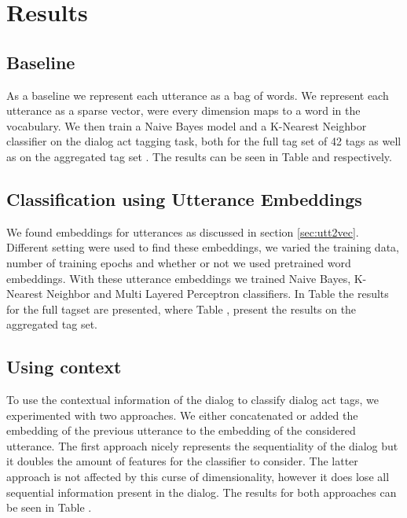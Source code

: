 \section{Results}\label{sec:results}
\subsection{Baseline}
As a baseline we represent each utterance as a bag of words. We represent each utterance as a sparse vector, were every dimension maps to a word in the vocabulary. We then train a Naive Bayes model and a K-Nearest Neighbor classifier on the dialog act tagging task, both for the full tag set of 42 tags as well as on the aggregated tag set . The results can be seen in Table  and  respectively. 

\subsection{Classification using Utterance Embeddings}
We found embeddings for utterances as discussed in section \ref{sec:utt2vec}. Different setting were used to find these embeddings, we varied the training data, number of training epochs and whether or not we used pretrained word embeddings. With these utterance embeddings we trained Naive Bayes, K-Nearest Neighbor and Multi Layered Perceptron classifiers. In Table  the results for the full tagset are presented, where Table , present the results on the aggregated tag set. 

\subsection{Using context}
To use the contextual information of the dialog to classify dialog act tags, we experimented with two  approaches. We either concatenated or added the embedding of the previous utterance to the embedding of the considered utterance. The first approach nicely represents the sequentiality of the dialog but it doubles the amount of features for the classifier to consider. The latter approach is not affected by this curse of dimensionality, however it does lose all sequential information present in the dialog. The results for both approaches can be seen in Table . 

